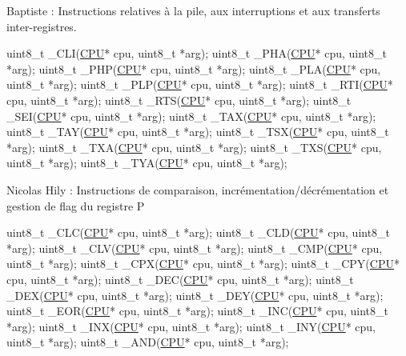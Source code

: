 Baptiste \+: Instructions relatives à la pile, aux interruptions et aux transferts inter-\/registres.


\begin{DoxyCode}
uint8\_t \_CLI(\hyperlink{struct_c_p_u}{CPU}* cpu, uint8\_t *arg);
uint8\_t \_PHA(\hyperlink{struct_c_p_u}{CPU}* cpu, uint8\_t *arg);
uint8\_t \_PHP(\hyperlink{struct_c_p_u}{CPU}* cpu, uint8\_t *arg);
uint8\_t \_PLA(\hyperlink{struct_c_p_u}{CPU}* cpu, uint8\_t *arg);
uint8\_t \_PLP(\hyperlink{struct_c_p_u}{CPU}* cpu, uint8\_t *arg);
uint8\_t \_RTI(\hyperlink{struct_c_p_u}{CPU}* cpu, uint8\_t *arg);
uint8\_t \_RTS(\hyperlink{struct_c_p_u}{CPU}* cpu, uint8\_t *arg);
uint8\_t \_SEI(\hyperlink{struct_c_p_u}{CPU}* cpu, uint8\_t *arg);
uint8\_t \_TAX(\hyperlink{struct_c_p_u}{CPU}* cpu, uint8\_t *arg);
uint8\_t \_TAY(\hyperlink{struct_c_p_u}{CPU}* cpu, uint8\_t *arg);
uint8\_t \_TSX(\hyperlink{struct_c_p_u}{CPU}* cpu, uint8\_t *arg);
uint8\_t \_TXA(\hyperlink{struct_c_p_u}{CPU}* cpu, uint8\_t *arg);
uint8\_t \_TXS(\hyperlink{struct_c_p_u}{CPU}* cpu, uint8\_t *arg);
uint8\_t \_TYA(\hyperlink{struct_c_p_u}{CPU}* cpu, uint8\_t *arg);
\end{DoxyCode}

\begin{DoxyItemize}
\item Nicolas Hily \+: Instructions de comparaison, incrémentation/décrémentation et gestion de flag du registre P
\end{DoxyItemize}


\begin{DoxyCode}
uint8\_t \_CLC(\hyperlink{struct_c_p_u}{CPU}* cpu, uint8\_t *arg);
uint8\_t \_CLD(\hyperlink{struct_c_p_u}{CPU}* cpu, uint8\_t *arg);
uint8\_t \_CLV(\hyperlink{struct_c_p_u}{CPU}* cpu, uint8\_t *arg);
uint8\_t \_CMP(\hyperlink{struct_c_p_u}{CPU}* cpu, uint8\_t *arg);
uint8\_t \_CPX(\hyperlink{struct_c_p_u}{CPU}* cpu, uint8\_t *arg);
uint8\_t \_CPY(\hyperlink{struct_c_p_u}{CPU}* cpu, uint8\_t *arg);
uint8\_t \_DEC(\hyperlink{struct_c_p_u}{CPU}* cpu, uint8\_t *arg);
uint8\_t \_DEX(\hyperlink{struct_c_p_u}{CPU}* cpu, uint8\_t *arg);
uint8\_t \_DEY(\hyperlink{struct_c_p_u}{CPU}* cpu, uint8\_t *arg);
uint8\_t \_EOR(\hyperlink{struct_c_p_u}{CPU}* cpu, uint8\_t *arg);
uint8\_t \_INC(\hyperlink{struct_c_p_u}{CPU}* cpu, uint8\_t *arg);
uint8\_t \_INX(\hyperlink{struct_c_p_u}{CPU}* cpu, uint8\_t *arg);
uint8\_t \_INY(\hyperlink{struct_c_p_u}{CPU}* cpu, uint8\_t *arg);
uint8\_t \_AND(\hyperlink{struct_c_p_u}{CPU}* cpu, uint8\_t *arg);
\end{DoxyCode}



